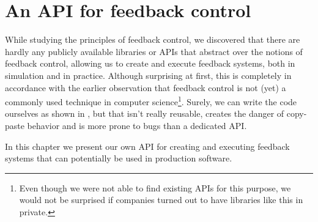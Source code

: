 \chapter{An API for feedback control}

While studying the principles of feedback control, we discovered that there are hardly any publicly available libraries or APIs that abstract over the notions of feedback control, allowing us to create and execute feedback systems, both in simulation and in practice. Although surprising at first, this is completely in accordance with the earlier observation that feedback control is not (yet) a commonly used technique in computer science\footnote{Even though we were not able to find existing APIs for this purpose, we would not be surprised if companies turned out to have libraries like this in private.}. Surely, we can write the code ourselves as shown in , but that isn't really reusable, creates the danger of copy-paste behavior and is more prone to bugs than a dedicated API.

In this chapter we present our own API for creating and executing feedback systems that can potentially be used in production software. 








































































